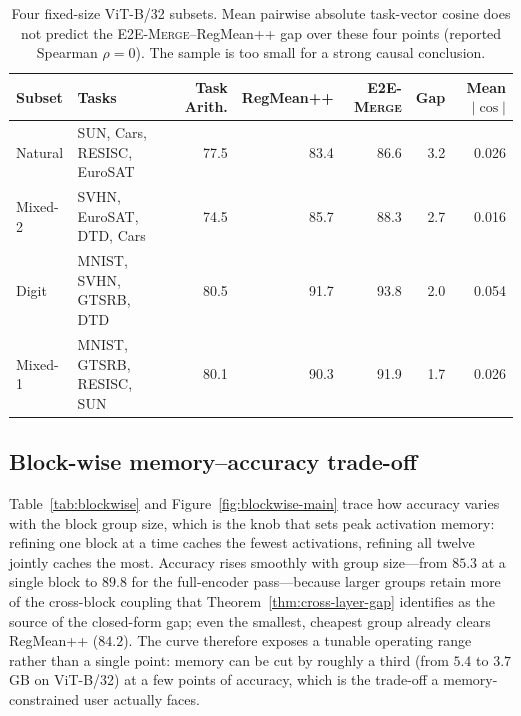 \documentclass[letterpaper]{article} %
\newcommand{\method}{\textup{\textsc{E2E-Merge}}\xspace}
\theoremstyle{plain}
\theoremstyle{definition}
\begin{document}
\begin{table}[tb]
\centering
{\small
\begin{tabular}{llrrrrr}
\toprule
Subset & Tasks & Task Arith. & RegMean++ & \method & Gap & Mean $|\cos|$ \\
\midrule
Natural & SUN, Cars, RESISC, EuroSAT & 77.5 & 83.4 & 86.6 & 3.2 & 0.026 \\
Mixed-2 & SVHN, EuroSAT, DTD, Cars & 74.5 & 85.7 & 88.3 & 2.7 & 0.016 \\
Digit & MNIST, SVHN, GTSRB, DTD & 80.5 & 91.7 & 93.8 & 2.0 & 0.054 \\
Mixed-1 & MNIST, GTSRB, RESISC, SUN & 80.1 & 90.3 & 91.9 & 1.7 & 0.026 \\
\bottomrule
\end{tabular}
}
\caption{Four fixed-size ViT-B/32 subsets. Mean pairwise absolute task-vector cosine does
not predict the \method--RegMean++ gap over these four points (reported Spearman $\rho=0$).
The sample is too small for a strong causal conclusion.}
\label{tab:intfprobe}
\end{table}

\subsection{Block-wise memory--accuracy trade-off}
\label{app:blockwise}
Table~\ref{tab:blockwise} and Figure~\ref{fig:blockwise-main} trace how accuracy varies with the block group size, which is the knob that sets peak activation memory: refining one block at a time caches the fewest activations, refining all twelve jointly caches the most.
Accuracy rises smoothly with group size---from $85.3$ at a single block to $89.8$ for the full-encoder pass---because larger groups retain more of the cross-block coupling that Theorem~\ref{thm:cross-layer-gap} identifies as the source of the closed-form gap; even the smallest, cheapest group already clears RegMean++ ($84.2$).
The curve therefore exposes a tunable operating range rather than a single point: memory can be cut by roughly a third (from $5.4$ to $3.7$ GB on ViT-B/32) at a few points of accuracy, which is the trade-off a memory-constrained user actually faces.
\end{document}
